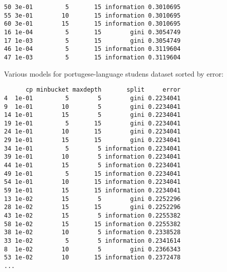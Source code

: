 \begin{verbatim}
50 3e-01         5       15 information 0.3010695
55 3e-01        10       15 information 0.3010695
60 3e-01        15       15 information 0.3010695
16 1e-04         5       15        gini 0.3054749
17 1e-03         5       15        gini 0.3054749
46 1e-04         5       15 information 0.3119604
47 1e-03         5       15 information 0.3119604
\end{verbatim}


Various models for portugese-language studens dataset sorted by error:
\begin{verbatim}
      cp minbucket maxdepth       split     error
4  1e-01         5        5        gini 0.2234041
9  1e-01        10        5        gini 0.2234041
14 1e-01        15        5        gini 0.2234041
19 1e-01         5       15        gini 0.2234041
24 1e-01        10       15        gini 0.2234041
29 1e-01        15       15        gini 0.2234041
34 1e-01         5        5 information 0.2234041
39 1e-01        10        5 information 0.2234041
44 1e-01        15        5 information 0.2234041
49 1e-01         5       15 information 0.2234041
54 1e-01        10       15 information 0.2234041
59 1e-01        15       15 information 0.2234041
13 1e-02        15        5        gini 0.2252296
28 1e-02        15       15        gini 0.2252296
43 1e-02        15        5 information 0.2255382
58 1e-02        15       15 information 0.2255382
38 1e-02        10        5 information 0.2338528
33 1e-02         5        5 information 0.2341614
8  1e-02        10        5        gini 0.2366343
53 1e-02        10       15 information 0.2372478
...
\end{verbatim}


